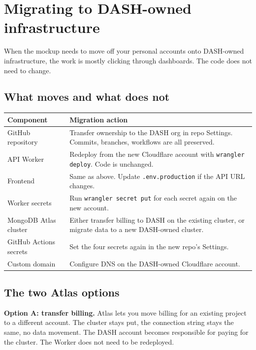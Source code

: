\documentclass[11pt,a4paper]{article}
\begin{document}
\section{Migrating to DASH-owned infrastructure}

When the mockup needs to move off your personal accounts onto DASH-owned infrastructure, the work is mostly clicking through dashboards. The code does not need to change.

\subsection{What moves and what does not}

\begin{center}
\begin{tabularx}{\textwidth}{l X}
\toprule
\textbf{Component} & \textbf{Migration action} \\
\midrule
GitHub repository & Transfer ownership to the DASH org in repo Settings. Commits, branches, workflows are all preserved. \\
API Worker & Redeploy from the new Cloudflare account with \texttt{wrangler deploy}. Code is unchanged. \\
Frontend & Same as above. Update \texttt{.env.production} if the API URL changes. \\
Worker secrets & Run \texttt{wrangler secret put} for each secret again on the new account. \\
MongoDB Atlas cluster & Either transfer billing to DASH on the existing cluster, or migrate data to a new DASH-owned cluster. \\
GitHub Actions secrets & Set the four secrets again in the new repo's Settings. \\
Custom domain & Configure DNS on the DASH-owned Cloudflare account. \\
\bottomrule
\end{tabularx}
\end{center}

\subsection{The two Atlas options}

\textbf{Option A: transfer billing.} Atlas lets you move billing for an existing project to a different account. The cluster stays put, the connection string stays the same, no data movement. The DASH account becomes responsible for paying for the cluster. The Worker does not need to be redeployed.
\end{document}
